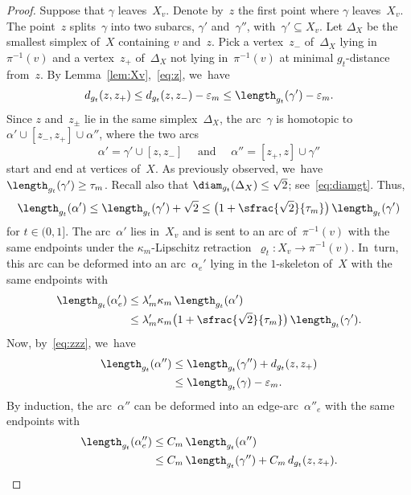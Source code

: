 \begin{proof}
Suppose that $\gamma$ leaves~$X_v$.
Denote by~$z$ the first point where $\gamma$ leaves~$X_v$.
The point~$z$ splits~$\gamma$ into two subarcs, $\gamma'$ and~$\gamma''$, with~$\gamma' \subseteq X_v$.
Let $\Delta_X$ be the smallest simplex of~$X$ containing $v$ and~$z$.
Pick a vertex~$z_-$ of~$\Delta_X$ lying in~$\pi^{-1}(v)$ and a vertex~$z_+$ of~$\Delta_X$ not lying in~$\pi^{-1}(v)$ at minimal $g_t$-distance from~$z$.
By Lemma~\ref{lem:Xv},~\eqref{eq:z}, we~have
\begin{equation} \label{eq:zzz}
d_{g_t}(z,z_+) \leq d_{g_t}(z,z_-) - \varepsilon_m \leq \length_{g_t}(\gamma') - \varepsilon_m.
\end{equation}
Since $z$ and~$z_{\pm}$ lie in the same simplex~$\Delta_X$, the arc~$\gamma$ is homotopic to~$\alpha' \cup [z_-,z_+] \cup \alpha''$, where the two arcs
\[
\alpha' = \gamma' \cup [z,z_-] \quad \mbox { and } \quad \alpha'' = [z_+,z] \cup \gamma''
\]
start and end at vertices of~$X$.
As previously observed, we~have $\length_{g_t}(\gamma') \geq \tau_m$.
Recall also that $\diam_{g_t}(\Delta_X) \leq \sqrt{2}$; see~\eqref{eq:diamgt}.
Thus,
\[
\length_{g_t}(\alpha') \leq \length_{g_t}(\gamma') + \sqrt{2} \leq \bigl(1+\sfrac{\sqrt{2}}{\tau_m} \bigr) \, \length_{g_t}(\gamma')
\]
for $t \in (0,1]$.
The arc~$\alpha'$ lies in~$X_v$ and is sent to an arc of~$\pi^{-1}(v)$ with the same endpoints under the $\kappa_m$-Lipschitz retraction~$\varrho_t:X_v \to \pi^{-1}(v)$. In~turn, this arc can be deformed into an arc~$\alpha_e'$ lying in the $1$-skeleton of~$X$ with the same endpoints with
\begin{equation}\label{eq:a'}
\begin{aligned}
\length_{g_t}(\alpha_e') & \leq \lambda'_m \kappa_m \, \length_{g_t}(\alpha') \\ & \leq \lambda'_m \kappa_m \bigl(1 + \sfrac{\sqrt{2}}{\tau_m} \bigr) \, \length_{g_t}(\gamma'). \end{aligned}
\end{equation}
Now, by~\eqref{eq:zzz}, we~have
\begin{align*}
\length_{g_t}(\alpha'') & \leq \length_{g_t}(\gamma'') + d_{g_t}(z,z_+) \\ & \leq \length_{g_t}(\gamma) - \varepsilon_m.
\end{align*}
By induction, the arc~$\alpha''$ can be deformed into an edge-arc~$\alpha''_e$ with the same endpoints with
\begin{equation}\label{eq:a''}
\begin{aligned}
\length_{g_t}(\alpha''_e) & \leq C_m \, \length_{g_t}(\alpha'') \\ & \leq C_m \, \length_{g_t}(\gamma'') + C_m \, d_{g_t}(z,z_+).

\end{aligned}
\end{equation}
\end{proof}
